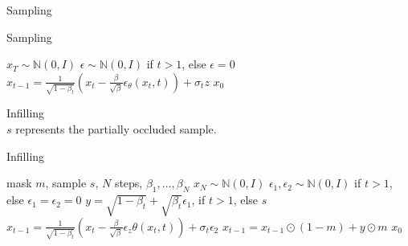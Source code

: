 \documentclass{article}
\begin{document}
\noindent
Sampling
\begin{algorithm}
	\renewcommand{\algorithmicrequire}{\textbf{Input:}}
	\renewcommand{\algorithmicensure}{\textbf{Output:}}
	\caption{Sampling}
	\label{alg:1}
	\begin{algorithmic}[H]
      \STATE $x_T \sim \mathbb{N}(0, I)$
      \STATE $\epsilon \sim \mathbb{N}(0, I)$ if $t > 1$, else $\epsilon = 0$
      \STATE $x_{t-1} = \frac{1}{\sqrt{1-\beta_t}}(x_t - \frac{\beta}{\sqrt{\beta}}\epsilon_\theta(x_t,t)) + \sigma_tz$
      \ENDFOR 
      \RETURN $x_0$
	\end{algorithmic}
\end{algorithm}

\newpage
\noindent
Infilling\\
$s$ represents the partially occluded sample.
\begin{algorithm}
	\renewcommand{\algorithmicrequire}{\textbf{Input:}}
	\renewcommand{\algorithmicensure}{\textbf{Output:}}
	\caption{Infilling}
	\label{alg:2}
	\begin{algorithmic}[H]
      \REQUIRE mask $m$, sample $s$, $N$ steps, $\beta_1, ..., \beta_N$
      \STATE $x_N \sim \mathbb{N}(0, I)$
      \STATE $\epsilon_1,\epsilon_2 \sim \mathbb{N}(0, I)$ if $t > 1$, else $\epsilon_1 = \epsilon_2 = 0$
      \STATE $y = \sqrt{1-\beta_t} + \sqrt{\beta_t}\epsilon_1$, if $t > 1$, else $s$
      \STATE $x_{t-1} = \frac{1}{\sqrt{1-\beta_t}}(x_t - \frac{\beta}{\sqrt{\beta}}\epsilon_z\theta(x_t,t)) + \sigma_t\epsilon_2$
      \STATE $x_{t-1} = x_{t-1} \odot (1-m) + y \odot m$
      \ENDFOR
      \RETURN $x_0$
	\end{algorithmic}
\end{algorithm}
\end{document}
